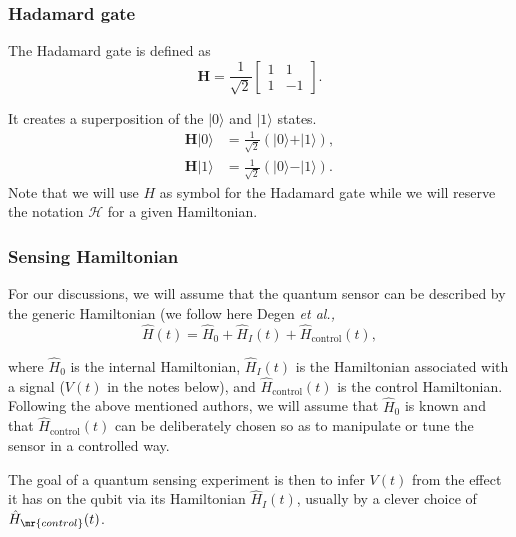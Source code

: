 \documentclass{beamer}
\begin{document}
\begin{frame}
\frametitle{Hadamard gate}

The Hadamard gate is defined as
\[
	\bm{H} = \frac{1}{\sqrt{2}} \begin{bmatrix}
		1 & 1 \\
		1 & -1
	\end{bmatrix}.
\]

It creates a superposition of the $ \vert 0\rangle $ and $ \vert 1\rangle $ states.
\begin{align}
	\bm{H}\vert 0\rangle &= \frac{1}{\sqrt{2}} \left( \vert 0\rangle + \vert 1\rangle \right), \\
	\bm{H}\vert 1\rangle &= \frac{1}{\sqrt{2}} \left( \vert 0\rangle - \vert 1\rangle \right).
\end{align}
Note that we will use $H$ as symbol for the Hadamard gate while we will reserve the notation $\mathcal{H}$ for a given Hamiltonian.
\end{frame}

\begin{frame}
\frametitle{Sensing Hamiltonian}

For our discussions, we will assume that the quantum sensor can be
described by the generic Hamiltonian (we follow here Degen \emph{et al.,}
\[
\hat{H}(t) = \hat{H}_0 + \hat{H}_I(t) + \hat{H}_\mathrm{control}(t),
\]

where $\hat{H}_0$ is the internal Hamiltonian, $\hat{H}_I(t)$ is the
Hamiltonian associated with a signal ($V(t)$ in the notes below), and
$\hat{H}_\mathrm{control}(t)$ is the control Hamiltonian.  Following the above mentioned authors, we  will assume
that $\hat{H}_0$ is known and that $\hat{H}_\mathrm{control}(t)$ can be
deliberately chosen so as to manipulate or tune the sensor in a
controlled way.

The goal of a quantum sensing experiment is then to
infer $V(t)$ from the effect it has on the qubit via its Hamiltonian
$\hat{H}_I(t)$, usually by a clever choice of
$\hat{H}_\mr{control}(t)$.
\end{frame}
\end{document}
